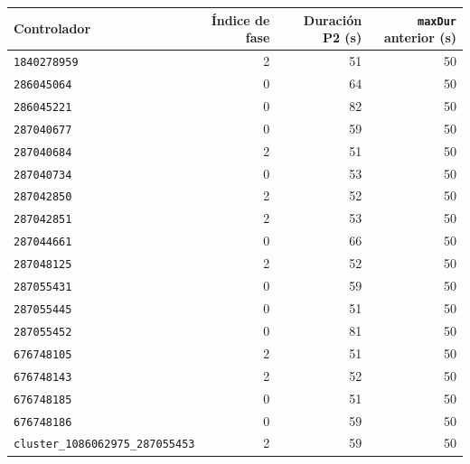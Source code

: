 \begin{tabular}{lrrr}\hline
Controlador & Índice de fase & Duración P2 (s) & \texttt{maxDur} anterior (s) \\\hline
\texttt{1840278959} & 2 & 51 & 50 \\
\texttt{286045064} & 0 & 64 & 50 \\
\texttt{286045221} & 0 & 82 & 50 \\
\texttt{287040677} & 0 & 59 & 50 \\
\texttt{287040684} & 2 & 51 & 50 \\
\texttt{287040734} & 0 & 53 & 50 \\
\texttt{287042850} & 2 & 52 & 50 \\
\texttt{287042851} & 2 & 53 & 50 \\
\texttt{287044661} & 0 & 66 & 50 \\
\texttt{287048125} & 2 & 52 & 50 \\
\texttt{287055431} & 0 & 59 & 50 \\
\texttt{287055445} & 0 & 51 & 50 \\
\texttt{287055452} & 0 & 81 & 50 \\
\texttt{676748105} & 2 & 51 & 50 \\
\texttt{676748143} & 2 & 52 & 50 \\
\texttt{676748185} & 0 & 51 & 50 \\
\texttt{676748186} & 0 & 59 & 50 \\
\texttt{cluster\_}\allowbreak\texttt{1086062975\_}\allowbreak\texttt{287055453} & 2 & 59 & 50 \\
\hline\end{tabular}
